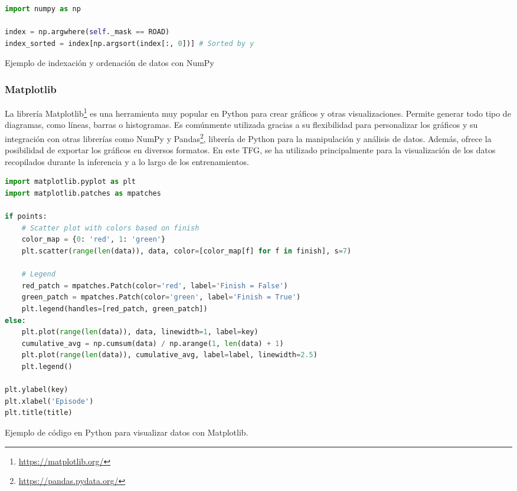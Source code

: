 \begin{code}[h]
\begin{lstlisting}[language=Python]
import numpy as np

index = np.argwhere(self._mask == ROAD)
index_sorted = index[np.argsort(index[:, 0])] # Sorted by y

\end{lstlisting}
\caption[Ejemplo de indexación y ordenación de datos con NumPy]{Ejemplo de indexación y ordenación de datos con NumPy}
\label{cod:numpy}
\end{code}

\subsubsection{Matplotlib}
\label{sec:plot}

La librería Matplotlib\footnote{\url{https://matplotlib.org/}} es una herramienta muy popular en Python para crear gráficos y otras visualizaciones. Permite generar todo tipo de diagramas, como líneas, barras o histogramas. Es comúnmente utilizada gracias a su flexibilidad para personalizar los gráficos y su integración con otras librerías como NumPy y Pandas\footnote{\url{https://pandas.pydata.org/}}, librería de Python para la manipulación y análisis de datos. Además, ofrece la posibilidad de exportar los gráficos en diversos formatos. En este \ac{TFG}, se ha utilizado principalmente para la visualización de los datos recopilados durante la inferencia y a lo largo de los entrenamientos.

\begin{code}[h]
\begin{lstlisting}[language=Python]
import matplotlib.pyplot as plt
import matplotlib.patches as mpatches

if points:
	# Scatter plot with colors based on finish
	color_map = {0: 'red', 1: 'green'}
	plt.scatter(range(len(data)), data, color=[color_map[f] for f in finish], s=7)
	
	# Legend
	red_patch = mpatches.Patch(color='red', label='Finish = False')
	green_patch = mpatches.Patch(color='green', label='Finish = True')
	plt.legend(handles=[red_patch, green_patch])  
else:
	plt.plot(range(len(data)), data, linewidth=1, label=key)
	cumulative_avg = np.cumsum(data) / np.arange(1, len(data) + 1)
	plt.plot(range(len(data)), cumulative_avg, label=label, linewidth=2.5)
	plt.legend()

plt.ylabel(key)
plt.xlabel('Episode')
plt.title(title)
\end{lstlisting}
\caption[Ejemplo de código en Python para visualizar datos con Matplotlib]{Ejemplo de código en Python para visualizar datos con Matplotlib.}
\label{cod:plot}
\end{code}

